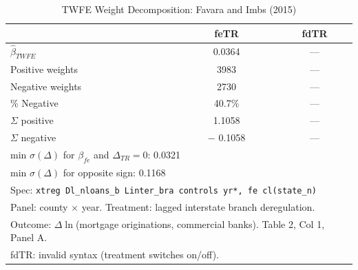 \begin{table}[htbp]
\centering
\caption{TWFE Weight Decomposition: Favara and Imbs (2015)}
\label{tab:favara_weights}
\begin{tabular}{lcc}
\hline\hline
 & feTR & fdTR \\
\hline
$\hat{\beta}_{TWFE}$ &    0.0364 & --- \\
Positive weights & 3983 & --- \\
Negative weights & 2730 & --- \\
\% Negative &  40.7\% & --- \\
$\Sigma$ positive &    1.1058 & --- \\
$\Sigma$ negative & $-$   0.1058 & --- \\
\hline
\multicolumn{3}{l}{\footnotesize min $\sigma(\Delta)$ for $\beta_{fe}$ and $\Delta_{TR}=0$:    0.0321} \\
\multicolumn{3}{l}{\footnotesize min $\sigma(\Delta)$ for opposite sign:    0.1168} \\
\hline
\multicolumn{3}{l}{\footnotesize Spec: \texttt{xtreg Dl\_nloans\_b Linter\_bra controls yr*, fe cl(state\_n)}} \\
\multicolumn{3}{l}{\footnotesize Panel: county $\times$ year. Treatment: lagged interstate branch deregulation.} \\
\multicolumn{3}{l}{\footnotesize Outcome: $\Delta \ln$(mortgage originations, commercial banks). Table 2, Col 1, Panel A.} \\
\multicolumn{3}{l}{\footnotesize fdTR: invalid syntax (treatment switches on/off).} \\
\hline\hline
\end{tabular}
\end{table}
